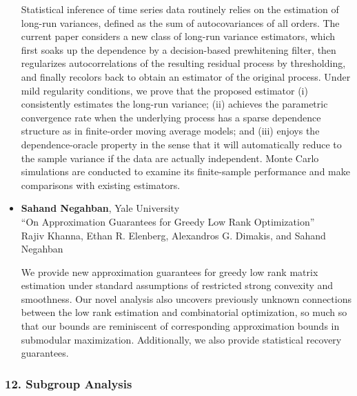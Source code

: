 \begin{itemize}
Statistical inference of time series data routinely relies on the estimation of long-run variances, defined as the sum of autocovariances of all orders. The current paper considers a new class of long-run variance estimators, which first soaks up the dependence by a decision-based prewhitening filter, then regularizes autocorrelations of the resulting residual process by thresholding, and finally recolors back to obtain an estimator of the original process. Under mild regularity conditions, we prove that the proposed estimator (i) consistently estimates the long-run variance; (ii) achieves the parametric convergence rate when the underlying process has a sparse dependence structure as in finite-order moving average models; and (iii) enjoys the dependence-oracle property in the sense that it will automatically reduce to the sample variance if the data are actually independent. Monte Carlo simulations are conducted to examine its finite-sample performance and make comparisons with existing estimators.

\item \textbf{Sahand Negahban}, Yale University \\
``On Approximation Guarantees for Greedy Low Rank Optimization'' \\
Rajiv Khanna, Ethan R. Elenberg, Alexandros G. Dimakis, and Sahand Negahban


We provide new approximation guarantees for greedy low rank matrix estimation under standard assumptions of restricted strong convexity and smoothness. Our novel analysis also uncovers previously unknown connections between the low rank estimation and combinatorial optimization, so much so that our bounds are reminiscent of corresponding approximation bounds in submodular maximization. Additionally, we also provide statistical recovery guarantees.

\end{itemize}

\subsubsection*{12. Subgroup Analysis}

